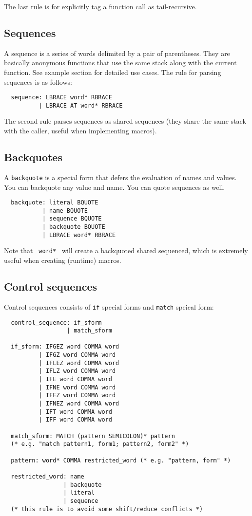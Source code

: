 \documentclass{article}
\begin{document}
The last rule is for explicitly tag a function call as tail-recursive.

\subsection{Sequences}

A sequence is a series of words delimited by a pair of parentheses. They are basically anonymous functions that use the same stack along with the current function. See example section for detailed use cases. The rule for parsing sequences is as follows:
\begin{verbatim}
  sequence: LBRACE word* RBRACE
          | LBRACE AT word* RBRACE
\end{verbatim}

The second rule parses sequences as shared sequences (they share the same stack with the caller, useful when implementing macros).

\subsection{Backquotes}

A \texttt{backquote} is a special form that defers the evaluation of names and values. You can backquote any value and name. You can quote sequences as well.
\begin{verbatim}
  backquote: literal BQUOTE
           | name BQUOTE
           | sequence BQUOTE
           | backquote BQUOTE
           | LBRACE word* RBRACE
\end{verbatim}

Note that \texttt{{ word* }} will create a backquoted shared sequenced, which is extremely useful when creating (runtime) macros.

\subsection{Control sequences}

Control sequences consists of \texttt{if} special forms and \texttt{match} speical form:
\begin{verbatim}
  control_sequence: if_sform
                  | match_sform

  if_sform: IFGEZ word COMMA word
          | IFGZ word COMMA word
          | IFLEZ word COMMA word
          | IFLZ word COMMA word
          | IFE word COMMA word
          | IFNE word COMMA word
          | IFEZ word COMMA word
          | IFNEZ word COMMA word
          | IFT word COMMA word
          | IFF word COMMA word

  match_sform: MATCH (pattern SEMICOLON)* pattern
  (* e.g. "match pattern1, form1; pattern2, form2" *)

  pattern: word* COMMA restricted_word (* e.g. "pattern, form" *)

  restricted_word: name
                 | backquote
                 | literal
                 | sequence
  (* this rule is to avoid some shift/reduce conflicts *)
\end{verbatim}
\end{document}
